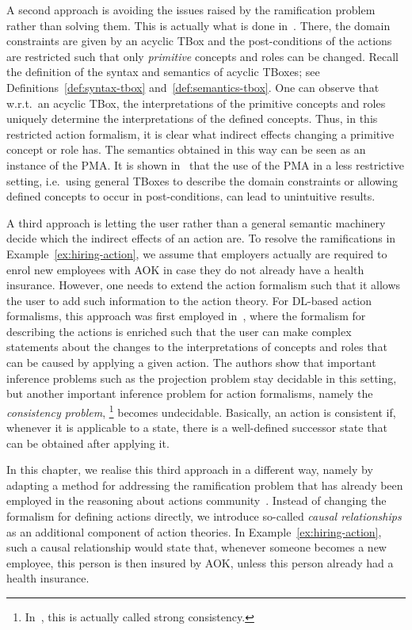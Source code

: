 A second approach is avoiding the issues raised by the ramification problem
rather than solving them.  This is actually what is done in~\cite{BLM+-AAAI05}.
There, the domain constraints are given by an acyclic TBox and the
post-conditions of the actions are restricted such that only \emph{primitive}
concepts and roles can be changed.  Recall the definition of the syntax and
semantics of acyclic TBoxes; see Definitions~\ref{def:syntax-tbox}
and~\ref{def:semantics-tbox}.  One can observe that w.r.t.\ an acyclic TBox, the
interpretations of the primitive concepts and roles uniquely determine the
interpretations of the defined concepts.  Thus, in this restricted action
formalism, it is clear what indirect effects changing a primitive concept or
role has.  The semantics obtained in this way can be seen as an instance of the
PMA\@.  It is shown in~\cite{BLM+-AAAI05} that the use of the PMA in a less
restrictive setting, i.e.~using general TBoxes to describe the domain
constraints or allowing defined concepts to occur in post-conditions, can lead
to unintuitive results.

A third approach is letting the user rather than a general semantic machinery
decide which the indirect effects of an action are.  To resolve the
ramifications in Example~\ref{ex:hiring-action}, we assume that employers
actually are required to enrol new employees with AOK in case they do not
already have a health insurance.  However, one needs to extend the action
formalism such that it allows the user to add such information to the action
theory.  For DL-based action formalisms, this approach was first employed
in~\cite{LLM+-JELIA06}, where the formalism for describing the actions is
enriched such that the user can make complex statements about the changes to the
interpretations of concepts and roles that can be caused by applying a given
action.  The authors show  that important inference problems such as the
projection problem stay decidable in this setting, but another important
inference problem for action formalisms, namely the \emph{consistency problem},%
\footnote{In~\cite{LLM+-JELIA06}, this is actually called strong consistency.}
becomes undecidable.  Basically, an action is consistent if, whenever it is
applicable to a state, there is a well-defined successor state that can be
obtained after applying it.

In this chapter, we realise this third approach in a different way, namely by
adapting a method for addressing the ramification problem that has already been
employed in the reasoning about actions
community~\cite{Lin-IJCAI95,Thi-AIJ97,BeDT-ESSLLI98,DeTB-LEACIS98,LiSo-AAAI11,StTh-JAL13}.
%
Instead of changing the formalism for defining actions directly, we introduce
so-called \emph{causal relationships} as an additional component of action
theories.  In Example~\ref{ex:hiring-action}, such a causal relationship would
state that, whenever someone becomes a new employee, this person is then insured
by AOK, unless this person already had a health insurance.

